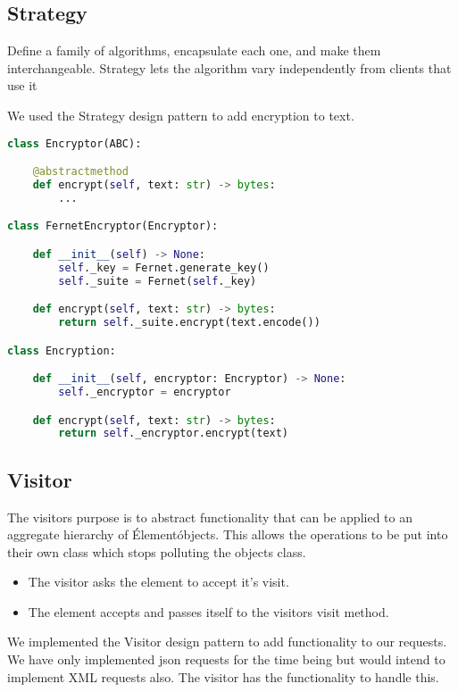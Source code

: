 \subsection{Strategy}
Define a family of algorithms, encapsulate each one, and make them interchangeable. Strategy lets the
algorithm vary independently from clients that use it~\citep{OODesign}

We used the Strategy design pattern to add encryption to text.


\begin{lstlisting}[language=Python]
class Encryptor(ABC):

	@abstractmethod
	def encrypt(self, text: str) -> bytes:
		...

class FernetEncryptor(Encryptor):

	def __init__(self) -> None:
		self._key = Fernet.generate_key()
		self._suite = Fernet(self._key)

	def encrypt(self, text: str) -> bytes:
		return self._suite.encrypt(text.encode())

class Encryption:

	def __init__(self, encryptor: Encryptor) -> None:
		self._encryptor = encryptor

	def encrypt(self, text: str) -> bytes:
		return self._encryptor.encrypt(text)
\end{lstlisting}

\subsection{Visitor}
The visitors purpose is to abstract functionality that can be applied to an aggregate hierarchy of \'Element\' objects. \cite{sourcemaking} This allows the operations to be put into their own class which stops polluting the objects class.
\begin{itemize}
	\item The visitor asks the element to accept it's visit.
	\item The element accepts and passes itself to the visitors visit method.
\end{itemize}

We implemented the Visitor design pattern to add functionality to our requests. We have only implemented json
requests for the time being but would intend to implement XML requests also. The visitor has the functionality
to handle this.

